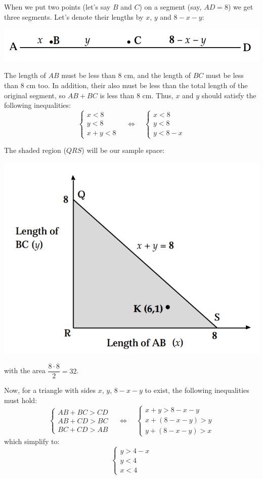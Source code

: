 \begin{solution} %
When we put two points (let's say $B$ and $C$) on a segment (say, $AD=8$) we get three segments. Let's denote their lengths by $x$, $y$ and $8-x-y$:
  \begin{center}
   \includegraphics[width=0.5\linewidth]{figs/line1.png}
  \end{center}

The length of $AB$ must be less than 8 cm, and the
length of $BC$ must be less than 8 cm too. In addition, their also must be less than the total
length of the original segment, so $AB + BC$ is less than 8 cm. Thus, $x$ and $y$ should satisfy the following inequalities:
\[
\begin{cases}
    x < 8 \\
    y < 8 \\
    x+y < 8
\end{cases}
\quad\Leftrightarrow \quad\begin{cases}
    x < 8 \\
    y < 8 \\
    y < 8-x
\end{cases}
\]

The shaded region ($QRS$) will be our sample space:
\begin{center}
    \includegraphics[width=0.4\linewidth]{figs/line2.png}
\end{center}
with the area $\dfrac{8\cdot 8 }{2}=32$. 

Now, for a triangle with sides $x$, $y$, $8-x-y$ to exist, the following inequalities must hold:
\[
\begin{cases}
    AB+BC>CD\\
    AB+CD>BC\\
    BC+CD>AB
\end{cases}\quad\Leftrightarrow\quad
\begin{cases}
    x + y > 8 - x - y \\
    x + (8 -x -y) > y\\
    y + (8 - x - y) > x 
\end{cases}
\]
which simplify to:
\[
\begin{cases}
    y>4-x\\
    y<4\\
    x<4
\end{cases}
\]


\end{solution}
